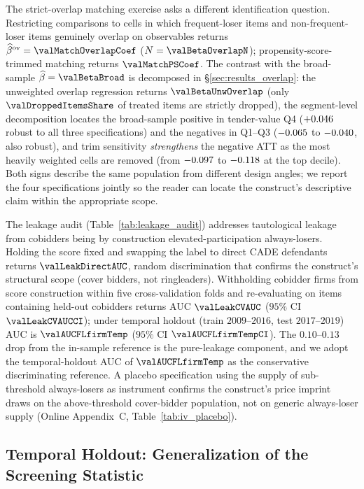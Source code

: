 The strict-overlap matching exercise asks a different
identification question. Restricting comparisons to cells in
which frequent-loser items and non-frequent-loser items
genuinely overlap on observables returns
$\widehat\beta^{\text{ov}}=\valMatchOverlapCoef$
($N=\valBetaOverlapN$); propensity-score-trimmed matching returns
$\valMatchPSCoef$. The contrast with the broad-sample
$\widehat\beta = \valBetaBroad$ is decomposed in
\S\ref{sec:results_overlap}: the unweighted overlap regression
returns $\valBetaUnwOverlap$ (only $\valDroppedItemsShare$ of
treated items are strictly dropped), the segment-level
decomposition locates the broad-sample positive in tender-value
Q4 ($+0.046$ robust to all three specifications) and
the negatives in Q1--Q3 ($-0.065$ to
$-0.040$, also robust), and trim sensitivity
\emph{strengthens} the negative ATT as the most heavily weighted
cells are removed (from $-0.097$ to $-0.118$ at
the top decile). Both signs describe the same population from
different design angles; we report the four specifications
jointly so the reader can locate the construct's descriptive
claim within the appropriate scope.

The leakage audit (Table~\ref{tab:leakage_audit}) addresses
tautological leakage from cobidders being by construction
elevated-participation always-losers. Holding the score fixed
and swapping the label to direct CADE defendants returns
$\valLeakDirectAUC$, random discrimination that confirms the
construct's structural scope (cover bidders, not ringleaders).
Withholding cobidder firms from score construction within five
cross-validation folds and re-evaluating on items containing
held-out cobidders returns AUC $\valLeakCVAUC$
($95\%$ CI $\valLeakCVAUCCI$); under temporal holdout
(train $2009$--$2016$, test $2017$--$2019$) AUC is
$\valAUCFLfirmTemp$ ($95\%$ CI $\valAUCFLfirmTempCI$). The
$0.10$--$0.13$ drop from the in-sample reference is the
pure-leakage component, and we adopt the temporal-holdout AUC of
$\valAUCFLfirmTemp$ as the conservative discriminating reference.
A placebo specification using the supply of sub-threshold
always-losers as instrument confirms the construct's price
imprint draws on the above-threshold cover-bidder population, not
on generic always-loser supply (Online Appendix~C,
Table~\ref{tab:iv_placebo}).

\subsection{Temporal Holdout: Generalization of the Screening Statistic}
\label{sec:rob_operational}

